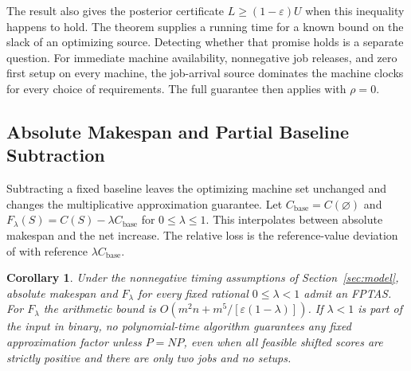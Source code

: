 \documentclass[11pt,letterpaper]{article}
\newtheorem{corollary}{Corollary}
\begin{document}
The result also gives the posterior certificate $L\ge(1-\varepsilon)U$ when this inequality happens to hold. The theorem supplies a running time for a known bound on the slack of an optimizing source. Detecting whether that promise holds is a separate question. For immediate machine availability, nonnegative job releases, and zero first setup on every machine, the job-arrival source dominates the machine clocks for every choice of requirements. The full guarantee then applies with $\rho=0$.

\subsection{Absolute Makespan and Partial Baseline Subtraction}

Subtracting a fixed baseline leaves the optimizing machine set unchanged and changes the multiplicative approximation guarantee. Let $C_{\mathrm{base}}=C(\varnothing)$ and $F_\lambda(S)=C(S)-\lambda C_{\mathrm{base}}$ for $0\le\lambda\le 1$. This interpolates between absolute makespan and the net increase. The relative loss is the reference-value deviation of \citet[][\S1]{Cornuejols1977} with reference $\lambda C_{\mathrm{base}}$.

\begin{corollary}
\label{cor:shifted}
Under the nonnegative timing assumptions of Section~\ref{sec:model}, absolute makespan and $F_\lambda$ for every fixed rational $0\le\lambda<1$ admit an FPTAS. For $F_\lambda$ the arithmetic bound is $O(m^2n+m^5/[\varepsilon(1-\lambda)])$. If $\lambda<1$ is part of the input in binary, no polynomial-time algorithm guarantees any fixed approximation factor unless $P=NP$, even when all feasible shifted scores are strictly positive and there are only two jobs and no setups.
\end{corollary}
\end{document}
